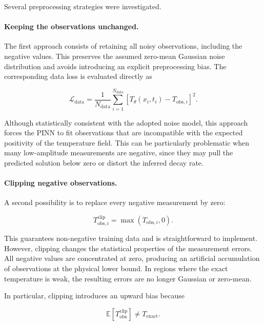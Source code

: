 Several preprocessing strategies were investigated.

\paragraph{Keeping the observations unchanged.}

The first approach consists of retaining all noisy observations, including the negative values. This preserves the assumed zero-mean Gaussian noise distribution and avoids introducing an explicit preprocessing bias. The corresponding data loss is evaluated directly as

\begin{equation}
\mathcal{L}_{\mathrm{data}}
=
\frac{1}{N_{\mathrm{data}}}
\sum_{i=1}^{N_{\mathrm{data}}}
\left[
T_{\theta}(x_i,t_i)
-
T_{\mathrm{obs},i}
\right]^2.
\end{equation}

Although statistically consistent with the adopted noise model, this approach forces the PINN to fit observations that are incompatible with the expected positivity of the temperature field. This can be particularly problematic when many low-amplitude measurements are negative, since they may pull the predicted solution below zero or distort the inferred decay rate.

\paragraph{Clipping negative observations.}

A second possibility is to replace every negative measurement by zero:

\begin{equation}
T_{\mathrm{obs},i}^{\mathrm{clip}}
=
\max\left(T_{\mathrm{obs},i},0\right).
\end{equation}

This guarantees non-negative training data and is straightforward to implement. However, clipping changes the statistical properties of the measurement errors. All negative values are concentrated at zero, producing an artificial accumulation of observations at the physical lower bound. In regions where the exact temperature is weak, the resulting errors are no longer Gaussian or zero-mean.

In particular, clipping introduces an upward bias because

\begin{equation}
\mathbb{E}
\left[
T_{\mathrm{obs}}^{\mathrm{clip}}
\right]
\neq
T_{\mathrm{exact}}.
\end{equation}

